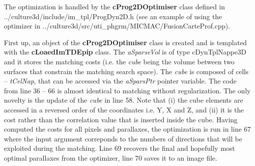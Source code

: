 The optimization is handled by the \textbf{cProg2DOptimiser} class defined in ../culture3d/include/\-im\_tpl/ProgDyn2D.h (see an example of using the optimizer in ../culture3d/src/uti\_phgrm/MICMAC/\-FusionCarteProf.cpp).\newline

First up, an object of the \textbf{cProg2DOptimiser} class is created and is templated with the \textbf{cLoaedImTDEpip} class. The \emph{aSparseVol} is of type cDynTplNappe3D and it stores the matching costs (i.e. the \emph{cube} being the volume between two surfaces that constrain the matching search space). The \emph{cube} is composed of cells -- \emph{tCelNap}, that can be accessed via the \emph{aSparsPtr} pointer variable. The code from line 36 -- 66 is almost identical to matching without regularization. The only novelty is the update of the \emph{cube} in line 58. Note that (i) the cube elements are accessed in a reversed order of the coordinates i.e. Y, X and Z, and (ii) it is the cost rather than the correlation value that is inserted inside the cube.\newline
Having computed the costs for all pixels and parallaxes, the optimization is run in line 67 where the input argument correponds to the numbers of directions that will be exploited during the matching. Line 69 recovers the final and hopefully most optimal parallaxes from the optimizer, line 70 saves it to an image file. 


